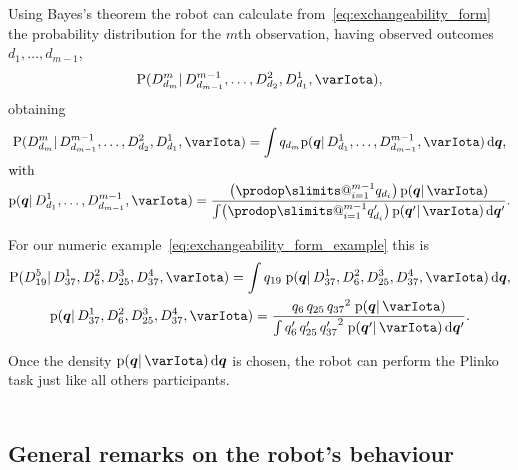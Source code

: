 \documentclass[\ifafour a4paper,12pt,\else a5paper,10pt,\fi%
onecolumn,oneside,article,%
british%
]{memoir}
\makeatletter
\theoremstyle{remark}
\theoremstyle{innote}
\def\prod{\DOTSI\prodop\slimits@}
\newcommand*{\di}{\mathrm{d}}%
\newcommand*{\pf}{\mathrm{p}}%
\newcommand*{\p}{\mathrm{P}}%
\renewcommand*{\|}{\mathpunct{|}}
\newcommand*{\yqq}{q}
\newcommand*{\yq}{\bm{\yqq}}
\newcommand*{\yI}{\varIota}
\makeatother
\begin{document}
Using Bayes's theorem the robot can calculate
from~\eqref{eq:exchangeability_form} the probability distribution for the
$m$th observation, having observed outcomes $d_1,\dotsc,d_{m-1}$,
\begin{equation}
  \label{eq:general_prediction}
  \p(D^{m}_{d_{m}} \|
  D^{m-1}_{d_{m-1}}, \dotsc,  D^2_{d_2}, D^1_{d_1},  \yI),
\end{equation}
obtaining
\begin{subequations}\label{eq:prediction_exchangeability}
  \begin{gather}
    \p(D^{m}_{d_{m}}\| D^{m-1}_{d_{m-1}}, \dotsc,  D^2_{d_2}, D^1_{d_1}, \yI)
    = \int \yqq_{d_{m}} \pf(\yq \| D^1_{d_1}, \dotsc, D^{m-1}_{d_{m-1}}, \yI)\,\di\yq,
    \\
    \shortintertext{with}
    \pf(\yq \| D^1_{d_1}, \dotsc, D^{m-1}_{d_{m-1}}, \yI)
    = \frac{ \bigl( \prod_{i=1}^{m-1} \yqq_{d_i} \bigr)\, \pf(\yq \| \yI)
      }{
      \int  \bigl( \prod_{i=1}^{m-1} \yqq_{d_i}' \bigr)\, \pf(\yq' \| \yI)\,\di\yq'
      }.
\label{eq:exchang_updated_prior}
  \end{gather}
\end{subequations}

For our numeric example~\eqref{eq:exchangeability_form_example} this is
\begin{subequations}\label{eq:prediction_exchangeability_example}
  \begin{gather}
    \p(D^5_{19} \| D^1_{37} , D^2_{6} , D^3_{25}, D^4_{37}, \yI)
    = \int \yqq_{19}\; \pf(\yq \|  D^1_{37} , D^2_{6} , D^3_{25}, D^4_{37}, \yI)\,\di\yq,
    \\
    \pf(\yq \|  D^1_{37} , D^2_{6} , D^3_{25}, D^4_{37}, \yI)
    = \frac{ \yqq_{6}\, \yqq_{25} \, {\yqq_{37}}^2\; \pf(\yq \| \yI)
    }{
      \int \yqq_{6}'\, \yqq_{25}' \, {\yqq_{37}'}^2\; \pf(\yq' \| \yI)\,\di\yq'
    }.
  \end{gather}
\end{subequations}

Once the density $\pf(\yq \| \yI)\,\di\yq$ is chosen, the robot can perform
the Plinko task just like all others participants.
\textcolor{white}{If you find this you can claim a postcard from me.}
%



\subsection{General remarks on the robot's behaviour}
\label{sec:remarks}
\end{document}

